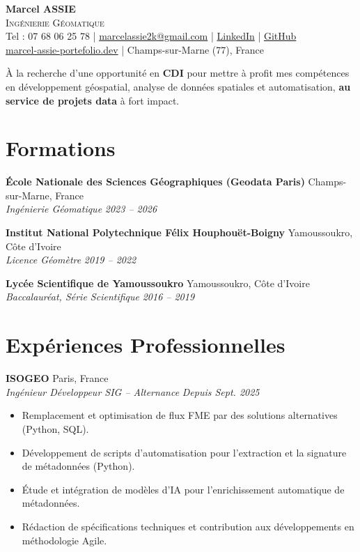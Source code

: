 \documentclass[11pt, a4paper]{article}
\newcommand{\cventry}[4]{
    \vspace{0.2cm}
    \noindent \textbf{#1} \hfill #2 \\
    \noindent \textit{#3} \hfill \textit{#4} \par
    \vspace{0.12cm}
}
\begin{document}
\pagestyle{empty} %

\begin{center}
    {\Huge \textbf{Marcel ASSIE}} \\[0.2cm]
    {\Large \textsc{Ingénierie Géomatique}} \\[0.3cm]
    \small
    Tel : 07 68 06 25 78
    \quad|\quad
    \href{mailto:marcelassie2k@gmail.com}{marcelassie2k@gmail.com}
    \quad|\quad
    \href{https://www.linkedin.com/in/marcel-assie/}{LinkedIn}
    \quad|\quad
    \href{https://github.com/MarcelAssie/}{GitHub} \\[0.15cm]
    \href{https://marcel-assie-portefolio.dev}{marcel-assie-portefolio.dev}
    \quad|\quad
    Champs-sur-Marne (77), France
\end{center}

\vspace{0.3cm}
\noindent À la recherche d’une opportunité en \textbf{CDI} pour mettre à profit mes compétences en développement géospatial, analyse de données spatiales et automatisation, \textbf{au service de projets data} à fort impact.

\section*{Formations}

\cventry{École Nationale des Sciences Géographiques (Geodata Paris)}{Champs-sur-Marne, France}{Ingénierie Géomatique}{2023 -- 2026}
\cventry{Institut National Polytechnique Félix Houphouët-Boigny}{Yamoussoukro, Côte d'Ivoire}{Licence Géomètre}{2019 -- 2022}
\cventry{Lycée Scientifique de Yamoussoukro}{Yamoussoukro, Côte d'Ivoire}{Baccalauréat, Série Scientifique}{2016 -- 2019}

\section*{Expériences Professionnelles}

\cventry{ISOGEO}{Paris, France}{Ingénieur Développeur SIG -- Alternance}{Depuis Sept. 2025}
\begin{itemize}[leftmargin=0.5cm, nosep]
    \item Remplacement et optimisation de flux FME par des solutions alternatives (Python, SQL).
    \item Développement de scripts d’automatisation pour l’extraction et la signature de métadonnées (Python).
    \item Étude et intégration de modèles d’IA pour l’enrichissement automatique de métadonnées.
    \item Rédaction de spécifications techniques et contribution aux développements en méthodologie Agile.
\end{itemize}
\end{document}
